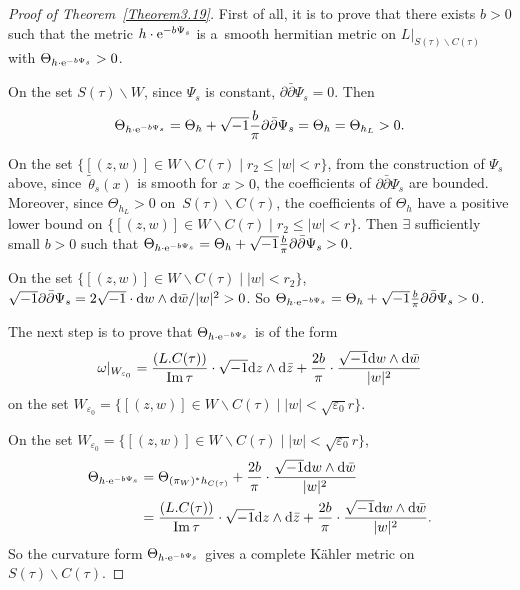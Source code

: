 \documentclass[pdftex]{sigma}
\numberwithin{equation}{section}
\begin{document}
\begin{proof}[Proof of Theorem~\ref{Theorem3.19}]
First of all, it is to prove that there exists $b>0$ such that the metric $h \cdot {\rm e}^{-b \Psi_s}$ is a~smooth hermitian metric on $L|_{S(\tau)\backslash C(\tau)}$ with $\Theta_{h \cdot {\rm e}^{-b \Psi_s}}>0$.

On the set $S(\tau)\backslash W$, since $\Psi_s$ is constant, $\partial \bar{\partial}\Psi_s=0$. Then
\[\Theta_{h \cdot {\rm e}^{-b \Psi_s}}=\Theta_h + \sqrt{-1} \frac{b}{\pi} \partial \bar{\partial} \Psi_s =\Theta_h=\Theta_{h_L}>0.\]

On the set $\{ [(z,w)]\in W\backslash C(\tau) \mid r_2 \leq |w|<r \}$, from the construction of $\Psi_s$ above, since~$\widetilde{\theta}_s(x)$ is smooth for $x>0$, the coefficients of $\partial \bar{\partial}\Psi_s$ are bounded. Moreover, since $\Theta_{h_L}>0$ on~$S(\tau)\backslash C(\tau)$, the coefficients of $\Theta_h$ have a positive lower bound on $\{ [(z,w)]\in W\backslash C(\tau) \mid r_2 \leq |w|<r \}$. Then $\exists$ sufficiently small $b>0$ such that $\Theta_{h \cdot {\rm e}^{-b \Psi_s}}=\Theta_h + \sqrt{-1} \frac{b}{\pi}\partial \bar{\partial} \Psi_s >0$.

On the set $\{ [(z,w)]\in W\backslash C(\tau) \mid |w|<r_2 \}$,
$\sqrt{-1} \partial \bar{\partial} \Psi_s=2 \sqrt{-1} \cdot {\rm d}w \wedge {\rm d}\bar{w} /|w|^2>0$.
So $\Theta_{h \cdot {\rm e}^{-b \Psi_s}}=\Theta_h + \sqrt{-1} \frac{b}{\pi}\partial \bar{\partial} \Psi_s >0$.

The next step is to prove that $\Theta_{h \cdot {\rm e}^{-b \Psi_s}}$ is of the form
\[
\omega|_{W_{\varepsilon_0}}=\frac{ (L.C(\tau))}{\operatorname{ Im}\tau}\cdot \sqrt{-1} {\rm d}z \wedge {\rm d} \bar{z}+\frac{2b}{\pi} \cdot \frac{\sqrt{-1}{\rm d}w \wedge {\rm d} \bar{w}}{|w|^2}
\]
on the set $W_{\varepsilon_0}=\{[(z,w)]\in W \backslash C(\tau)\mid |w|<\sqrt{\varepsilon_0}r\}$.

On the set $W_{\varepsilon_0}=\{[(z,w)]\in W \backslash C(\tau)\mid |w|<\sqrt{\varepsilon_0}r\}$,
\begin{align*}
\Theta_{h \cdot {\rm e}^{-b \Psi_s}}&=\Theta_{(\pi_W)^*h_{C(\tau)}}+\frac{2b}{\pi}\cdot \frac{\sqrt{-1}{\rm d}w \wedge {\rm d} \bar{w}}{|w|^2}\\
&=\frac{(L.C(\tau))}{\operatorname{ Im}\tau}\cdot \sqrt{-1} {\rm d}z \wedge {\rm d} \bar{z}+\frac{2b}{\pi}\cdot \frac{\sqrt{-1}{\rm d}w \wedge {\rm d} \bar{w}}{|w|^2}.
\end{align*}
 So the curvature form $\Theta_{h \cdot {\rm e}^{-b\Psi_s}}$ gives a complete K\"ahler metric on $S(\tau)\backslash C(\tau)$.


\end{proof}
\end{document}
